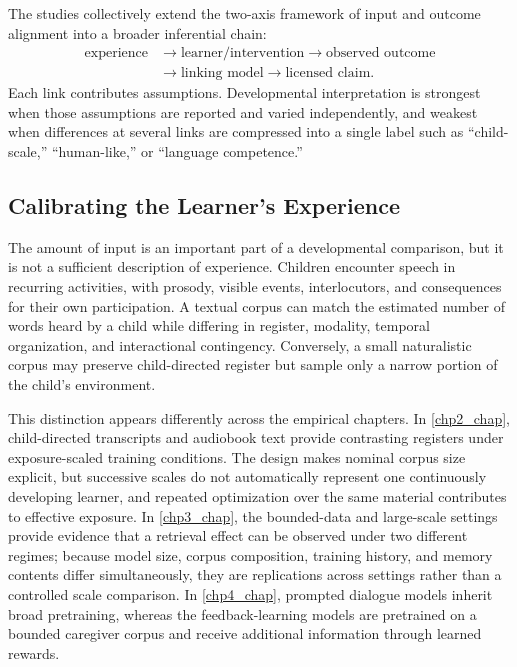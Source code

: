 The studies collectively extend the two-axis framework of input and outcome alignment into a broader inferential chain:
\[
\begin{aligned}
\text{experience} &\longrightarrow \text{learner/intervention}
\longrightarrow \text{observed outcome} \\
&\longrightarrow \text{linking model}
\longrightarrow \text{licensed claim}.
\end{aligned}
\]
Each link contributes assumptions. Developmental interpretation is strongest when those assumptions are reported and varied independently, and weakest when differences at several links are compressed into a single label such as ``child-scale,'' ``human-like,'' or ``language competence.''

\subsection{Calibrating the Learner's Experience}
\label{sec:gd_calibration_input}

The amount of input is an important part of a developmental comparison, but it is not a sufficient description of experience. Children encounter speech in recurring activities, with prosody, visible events, interlocutors, and consequences for their own participation. A textual corpus can match the estimated number of words heard by a child while differing in register, modality, temporal organization, and interactional contingency. Conversely, a small naturalistic corpus may preserve child-directed register but sample only a narrow portion of the child's environment.

This distinction appears differently across the empirical chapters. In \cref{chp2_chap}, child-directed transcripts and audiobook text provide contrasting registers under exposure-scaled training conditions. The design makes nominal corpus size explicit, but successive scales do not automatically represent one continuously developing learner, and repeated optimization over the same material contributes to effective exposure. In \cref{chp3_chap}, the bounded-data and large-scale settings provide evidence that a retrieval effect can be observed under two different regimes; because model size, corpus composition, training history, and memory contents differ simultaneously, they are replications across settings rather than a controlled scale comparison. In \cref{chp4_chap}, prompted dialogue models inherit broad pretraining, whereas the feedback-learning models are pretrained on a bounded caregiver corpus and receive additional information through learned rewards.

